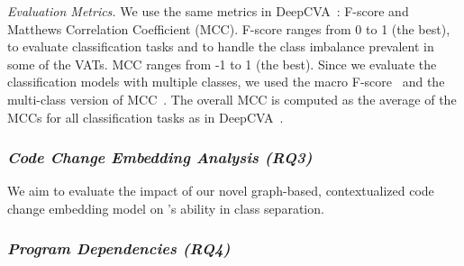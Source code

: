 \emph{Evaluation Metrics.} We use the same metrics in
DeepCVA~\cite{deepCVA-ase21}: F-score and Matthews Correlation
Coefficient (MCC). F-score ranges from 0 to 1 (the best), to evaluate
classification tasks and to handle the class imbalance prevalent in
some of the VATs. MCC ranges from -1 to 1 (the best).
Since we evaluate the classification models with multiple classes,
we used the macro F-score~\cite{spanos2018multi} and the multi-class
version of MCC~\cite{gorodkin04}. The overall MCC is computed as the
average of the MCCs for all classification tasks as in
DeepCVA~\cite{deepCVA-ase21}.









\subsubsection{\bf \em Code Change Embedding Analysis (RQ3)}

We aim to evaluate the impact of our novel graph-based, contextualized
code change embedding model on {\tool}'s ability in class separation.



\subsubsection{\bf \em Program Dependencies (RQ4)}

